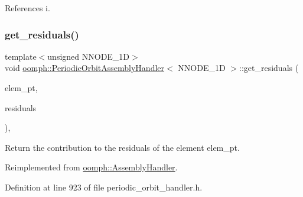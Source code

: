 References i.

\mbox{\label{classoomph_1_1PeriodicOrbitAssemblyHandler_af43abc524b34d8e8035e2c2323e2fc87}} 
\subsubsection{\texorpdfstring{get\+\_\+residuals()}{get\_residuals()}}
{\footnotesize\ttfamily template$<$unsigned N\+N\+O\+D\+E\+\_\+1D$>$ \\
void \hyperlink{classoomph_1_1PeriodicOrbitAssemblyHandler}{oomph\+::\+Periodic\+Orbit\+Assembly\+Handler}$<$ N\+N\+O\+D\+E\+\_\+1D $>$\+::get\+\_\+residuals (\begin{DoxyParamCaption}\item[{\hyperlink{classoomph_1_1GeneralisedElement}{Generalised\+Element} $\ast$const \&}]{elem\+\_\+pt,  }\item[{\hyperlink{classoomph_1_1Vector}{Vector}$<$ double $>$ \&}]{residuals }\end{DoxyParamCaption})\hspace{0.3cm}{\ttfamily [inline]}, {\ttfamily [virtual]}}



Return the contribution to the residuals of the element elem\+\_\+pt. 



Reimplemented from \hyperlink{classoomph_1_1AssemblyHandler_a7a6203b0ab90da62b4da2af8a26d08b3}{oomph\+::\+Assembly\+Handler}.



Definition at line 923 of file periodic\+\_\+orbit\+\_\+handler.\+h.

\mbox{\label{classoomph_1_1PeriodicOrbitAssemblyHandler_ab960ecaac9239cfbc47f1036893362ff}} 
